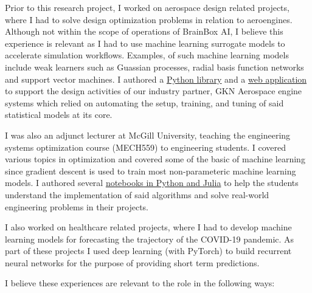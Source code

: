 \documentclass[12pt]{article} %
\begin{document}
Prior to this research project, I worked on aerospace design related projects, where I had to solve design optimization problems in relation to aeroengines. Although not within the scope of operations of BrainBox AI, I believe this experience is relevant as I had to use machine learning surrogate models to accelerate simulation workflows. Examples, of such machine learning models include weak learners such as Guassian processes, radial basis function networks and support vector machines. I authored a \href{https://sed-group.github.io/mvmlib/index.html}{Python library} and a \href{https://github.com/khbalhandawi/scale_AM_webapp}{web application} to support the design activities of our industry partner, GKN Aerospace engine systems which relied on automating the setup, training, and tuning of said statistical models at its core.

I was also an adjunct lecturer at McGill University, teaching the engineering systems optimization course (MECH559) to engineering students. I covered various topics in optimization and covered some of the basic of machine learning since gradient descent is used to train most non-parameteric machine learning models. I authored several \href{https://github.com/khbalhandawi/MECH559_notebooks}{notebooks in Python and Julia} to help the students understand the implementation of said algorithms and solve real-world engineering problems in their projects.

I also worked on healthcare related projects, where I had to develop machine learning models for forecasting the trajectory of the COVID-19 pandemic. As part of these projects I used deep learning (with PyTorch) to build recurrent neural networks for the purpose of providing short term predictions.

I believe these experiences are relevant to the role in the following ways: 
\end{document}
